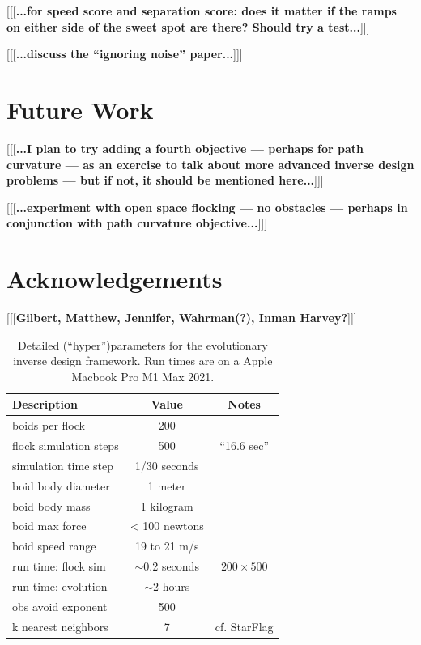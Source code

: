 \documentclass[letterpaper]{article}
\begin{document}
[[[\textbf{...for speed score and separation score: does it matter if the ramps on either side of the sweet spot are there? Should try a test...}]]]

[[[\textbf{...discuss the ``ignoring noise'' paper...}]]]

\section{Future Work}
\label{sec:future}

[[[\textbf{...I plan to try adding a fourth objective --- perhaps for path curvature --- as an exercise to talk about more advanced inverse design problems --- but if not, it should be mentioned here...}]]]

[[[\textbf{...experiment with open space flocking --- no obstacles --- perhaps in conjunction with path curvature objective...}]]]

\section{Acknowledgements}
\label{sec:ack}

[[[\textbf{Gilbert, Matthew, Jennifer, Wahrman(?), Inman Harvey?}]]]


\begin{table}[b]
\centering
\begin{tabular}{ | l | c | c | }
    \hline
    \textbf{Description} & \textbf{Value} & \textbf{Notes} \\
    \hline
    boids per flock & 200 &  \\
    flock simulation steps & 500 & ``16.6 sec'' \\
    simulation time step & 1/30 seconds & \\
    boid body diameter & 1 meter & \\
    boid body mass & 1 kilogram & \\
    boid max force & < 100 newtons & \\
    boid speed range & 19 to 21 m/s & \\
    run time: flock sim & $\sim$0.2 seconds & $200{\times}500$ \\
    run time: evolution & $\sim$2 hours & \\
    obs avoid exponent & 500 & \\
    k nearest neighbors & 7 & cf. StarFlag \\
    \hline
\end{tabular}
\caption{Detailed (``hyper'')parameters for the evolutionary inverse design framework. Run times are on a Apple Macbook Pro M1 Max 2021.}
\label{table:HyperParameters}
\end{table}
\end{document}
